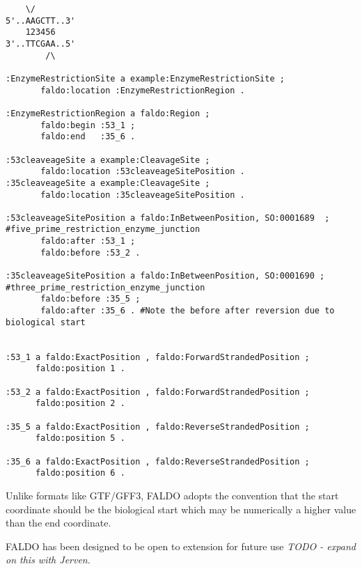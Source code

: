 \begin{framed}
\small
\begin{verbatim}
    \/
5'..AAGCTT..3' 
    123456
3'..TTCGAA..5'
        /\
        
:EnzymeRestrictionSite a example:EnzymeRestrictionSite ;
       faldo:location :EnzymeRestrictionRegion .
       
:EnzymeRestrictionRegion a faldo:Region ;
       faldo:begin :53_1 ;
       faldo:end   :35_6 .
       
:53cleaveageSite a example:CleavageSite ;
       faldo:location :53cleaveageSitePosition .
:35cleaveageSite a example:CleavageSite ;
       faldo:location :35cleaveageSitePosition .
        
:53cleaveageSitePosition a faldo:InBetweenPosition, SO:0001689  ; #five_prime_restriction_enzyme_junction 
       faldo:after :53_1 ;        
       faldo:before :53_2 .
       
:35cleaveageSitePosition a faldo:InBetweenPosition, SO:0001690 ; #three_prime_restriction_enzyme_junction 
       faldo:before :35_5 ;
       faldo:after :35_6 . #Note the before after reversion due to biological start      

       
:53_1 a faldo:ExactPosition , faldo:ForwardStrandedPosition ;
      faldo:position 1 .

:53_2 a faldo:ExactPosition , faldo:ForwardStrandedPosition ;
      faldo:position 2 .

:35_5 a faldo:ExactPosition , faldo:ReverseStrandedPosition ;
      faldo:position 5 .

:35_6 a faldo:ExactPosition , faldo:ReverseStrandedPosition ;
      faldo:position 6 .
\end{verbatim}
\end{framed}

Unlike formats like GTF/GFF3, FALDO adopts the convention
that the start coordinate should be the biological start which 
may be numerically a higher value than the end coordinate.

FALDO has been designed to be open to extension for future
use \textit{TODO - expand on this with Jerven}.
